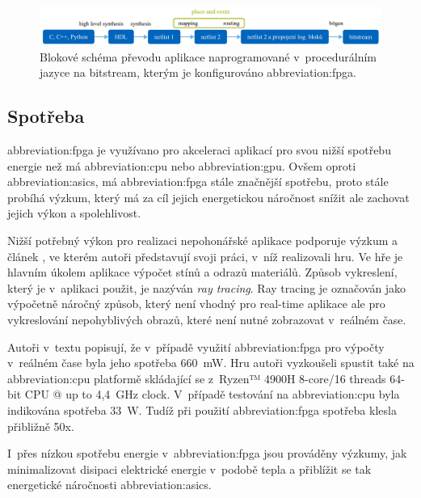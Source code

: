 \documentclass[a4paper, twoside, 11pt]{article}
\newcommand{\fbar}{\FloatBarrier}
\begin{document}
			
			\begin{figure}[htbp!]
				\centering
					\includegraphics[width=1\textwidth]{src/pdf/fpga-hls-to-bitstream-flow-chart.pdf} 
					\caption{Blokové schéma převodu aplikace naprogramované v~procedurálním jazyce na bitstream, kterým je konfigurováno \gls{abbreviation:fpga}.}
					\label{fig:fpga-hls-to-bitstream-flow-chart}
			\end{figure}

		\fbar
		\subsection{Spotřeba}
			\gls{abbreviation:fpga} je využívano pro akceleraci aplikací pro svou nižší spotřebu energie než má \gls{abbreviation:cpu} nebo \gls{abbreviation:gpu}. Ovšem oproti \gls{abbreviation:asics}, má \gls{abbreviation:fpga} stále značnější spotřebu, proto stále probíhá výzkum, který má za cíl jejich energetickou náročnost snížit ale zachovat jejich výkon a spolehlivost.\par
			Nižší potřebný výkon pro realizaci nepohonářské aplikace podporuje výzkum a článek \cite{rovere-sphery-vs-shapes}, ve kterém autoři představují svoji práci, v~níž realizovali hru. Ve hře je hlavním úkolem aplikace výpočet stínů a odrazů materiálů. Způsob vykreslení, který je v~aplikaci použit, je nazýván \textit{ray tracing}. Ray tracing je označován jako výpočetně náročný způsob, který není vhodný pro real-time aplikace ale pro vykreslování nepohyblivých obrazů, které není nutné zobrazovat v~reálném čase. \cite{wikipedia-ray-tracing}\par
			Autoři v~textu popisují, že v~případě využití \gls{abbreviation:fpga} pro výpočty v~reálném čase byla jeho spotřeba 660~mW. Hru autoři vyzkoušeli spustit také na \gls{abbreviation:cpu} platformě skládající se z~Ryzen™️ 4900H 8-core/16 threads 64-bit CPU @ up to 4,4~GHz clock. V~případě testování na \gls{abbreviation:cpu} byla indikována spotřeba 33~W. Tudíž při použití \gls{abbreviation:fpga} spotřeba klesla přibližně 50x. \cite{rovere-sphery-vs-shapes}\par
			I~přes nízkou spotřebu energie v~\gls{abbreviation:fpga} jsou prováděny výzkumy, jak minimalizovat disipaci elektrické energie v~podobě tepla a přiblížit se tak energetické náročnosti \gls{abbreviation:asics}.\par
\end{document}
